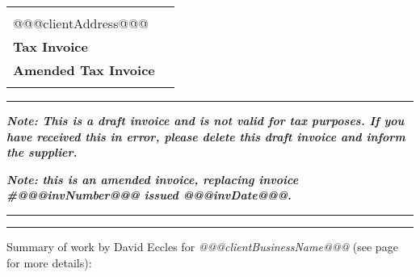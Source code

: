 \documentclass[10pt,a4paper,twoside]{letter}
\begin{document}

\hspace{\fill}

\begin{tabular}{lr}
  \begin{minipage}[c]{0.55\textwidth}
    @@@clientName@@@\\%
    @@@clientAddress@@@
  \end{minipage} &
  \begin{minipage}[c]{0.4\textwidth}
    \begin{center}
      \begin{framed}
        \huge{\textbf{Draft Invoice}}\\%
        \Huge{\textbf{Tax Invoice}}\\%
        \large{\textbf{Amended Tax Invoice}}\\%
      \end{framed}
    \end{center}
  \end{minipage}%
\end{tabular}

\rule{\linewidth}{1pt}

\leftskip=10pt

\emph{\textbf{Note: This is a draft invoice and is not valid %
    for tax purposes. If you have received this in error, %
    please delete this draft invoice and inform the supplier.}}%

\emph{\textbf{Note: this is an amended invoice, replacing %
    invoice \#@@@invNumber@@@ issued @@@invDate@@@.}}%

\leftskip=0pt

\rule{\linewidth}{1pt} %
\rule{\linewidth}{1pt} %

\leftskip=10pt

Summary of work by David Eccles for \emph{@@@clientBusinessName@@@}
(see page \pageref{sec:sub-job-details} for more details):
\end{document}
